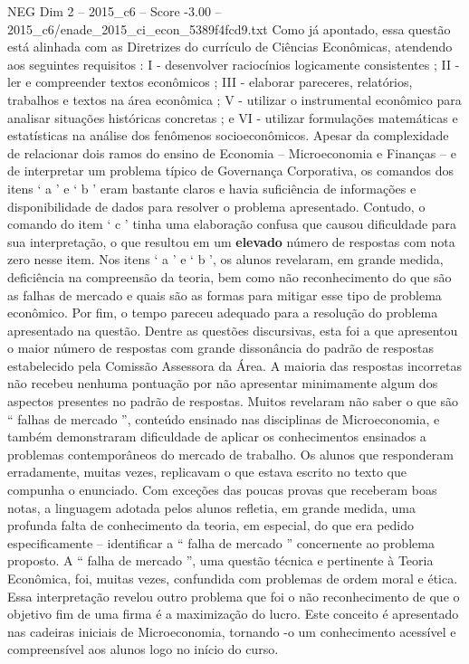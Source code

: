 \begin{textsample}{NEG Dim 2 – 2015\_c6 – Score -3.00 – 2015\_c6/enade\_2015\_ci\_econ\_5389f4fcd9.txt}
Como já apontado, essa questão está alinhada com as Diretrizes do currículo de Ciências Econômicas, atendendo aos seguintes requisitos : I - desenvolver raciocínios logicamente consistentes ; II - ler e compreender textos econômicos ; III - elaborar pareceres, relatórios, trabalhos e textos na área econômica ; V - utilizar o instrumental econômico para analisar situações históricas concretas ; e VI - utilizar formulações matemáticas e estatísticas na análise dos fenômenos socioeconômicos.
Apesar da complexidade de relacionar dois ramos do ensino de Economia – Microeconomia e Finanças – e de interpretar um problema típico de Governança Corporativa, os comandos dos itens ‘ a ’ e ‘ b ’ eram bastante claros e havia suficiência de informações e disponibilidade de dados para resolver o problema apresentado.
Contudo, o comando do item ‘ c ’ tinha uma elaboração confusa que causou dificuldade para sua interpretação, o que resultou em um \textbf{elevado} número de respostas com nota zero nesse item.
Nos itens ‘ a ’ e ‘ b ’, os alunos revelaram, em grande medida, deficiência na compreensão da teoria, bem como não reconhecimento do que são as falhas de mercado e quais são as formas para mitigar esse tipo de problema econômico.
Por fim, o tempo pareceu adequado para a resolução do problema apresentado na questão.
Dentre as questões discursivas, esta foi a que apresentou o maior número de respostas com grande dissonância do padrão de respostas estabelecido pela Comissão Assessora da Área.
A maioria das respostas incorretas não recebeu nenhuma pontuação por não apresentar minimamente algum dos aspectos presentes no padrão de respostas.
Muitos revelaram não saber o que são “ falhas de mercado ”, conteúdo ensinado nas disciplinas de Microeconomia, e também demonstraram dificuldade de aplicar os conhecimentos ensinados a problemas contemporâneos do mercado de trabalho.
Os alunos que responderam erradamente, muitas vezes, replicavam o que estava escrito no texto que compunha o enunciado.
Com exceções das poucas provas que receberam boas notas, a linguagem adotada pelos alunos refletia, em grande medida, uma profunda falta de conhecimento da teoria, em especial, do que era pedido especificamente – identificar a “ falha de mercado ” concernente ao problema proposto.
A “ falha de mercado ”, uma questão técnica e pertinente à Teoria Econômica, foi, muitas vezes, confundida com problemas de ordem moral e ética.
Essa interpretação revelou outro problema que foi o não reconhecimento de que o objetivo fim de uma firma é a maximização do lucro.
Este conceito é apresentado nas cadeiras iniciais de Microeconomia, tornando -o um conhecimento acessível e compreensível aos alunos logo no início do curso.

\end{textsample}
